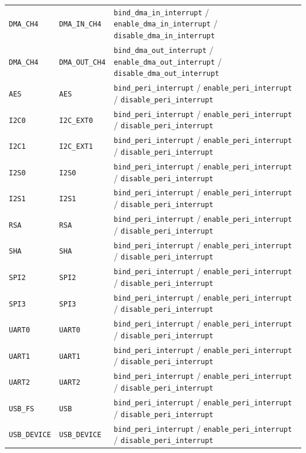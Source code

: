 \documentclass[UTF8,a4paper,11pt,fontset=fandol]{ctexart}
\newcommand{\fld}[1]{\texttt{#1}}
\begin{document}
\begin{center}
\begin{longtable}{@{}p{2.2cm}p{2.85cm}>{\raggedright\arraybackslash}p{7.55cm}@{}}
\fld{DMA\_CH4} & \fld{DMA\_IN\_CH4} & \fld{bind\_dma\_in\_interrupt} / \fld{enable\_dma\_in\_interrupt} / \fld{disable\_dma\_in\_interrupt} \\
\fld{DMA\_CH4} & \fld{DMA\_OUT\_CH4} & \fld{bind\_dma\_out\_interrupt} / \fld{enable\_dma\_out\_interrupt} / \fld{disable\_dma\_out\_interrupt} \\
\fld{AES} & \fld{AES} & \fld{bind\_peri\_interrupt} / \fld{enable\_peri\_interrupt} / \fld{disable\_peri\_interrupt} \\
\fld{I2C0} & \fld{I2C\_EXT0} & \fld{bind\_peri\_interrupt} / \fld{enable\_peri\_interrupt} / \fld{disable\_peri\_interrupt} \\
\fld{I2C1} & \fld{I2C\_EXT1} & \fld{bind\_peri\_interrupt} / \fld{enable\_peri\_interrupt} / \fld{disable\_peri\_interrupt} \\
\fld{I2S0} & \fld{I2S0} & \fld{bind\_peri\_interrupt} / \fld{enable\_peri\_interrupt} / \fld{disable\_peri\_interrupt} \\
\fld{I2S1} & \fld{I2S1} & \fld{bind\_peri\_interrupt} / \fld{enable\_peri\_interrupt} / \fld{disable\_peri\_interrupt} \\
\fld{RSA} & \fld{RSA} & \fld{bind\_peri\_interrupt} / \fld{enable\_peri\_interrupt} / \fld{disable\_peri\_interrupt} \\
\fld{SHA} & \fld{SHA} & \fld{bind\_peri\_interrupt} / \fld{enable\_peri\_interrupt} / \fld{disable\_peri\_interrupt} \\
\fld{SPI2} & \fld{SPI2} & \fld{bind\_peri\_interrupt} / \fld{enable\_peri\_interrupt} / \fld{disable\_peri\_interrupt} \\
\fld{SPI3} & \fld{SPI3} & \fld{bind\_peri\_interrupt} / \fld{enable\_peri\_interrupt} / \fld{disable\_peri\_interrupt} \\
\fld{UART0} & \fld{UART0} & \fld{bind\_peri\_interrupt} / \fld{enable\_peri\_interrupt} / \fld{disable\_peri\_interrupt} \\
\fld{UART1} & \fld{UART1} & \fld{bind\_peri\_interrupt} / \fld{enable\_peri\_interrupt} / \fld{disable\_peri\_interrupt} \\
\fld{UART2} & \fld{UART2} & \fld{bind\_peri\_interrupt} / \fld{enable\_peri\_interrupt} / \fld{disable\_peri\_interrupt} \\
\fld{USB\_FS} & \fld{USB} & \fld{bind\_peri\_interrupt} / \fld{enable\_peri\_interrupt} / \fld{disable\_peri\_interrupt} \\
\fld{USB\_DEVICE} & \fld{USB\_DEVICE} & \fld{bind\_peri\_interrupt} / \fld{enable\_peri\_interrupt} / \fld{disable\_peri\_interrupt} \\

\end{longtable}
\end{center}
\end{document}
